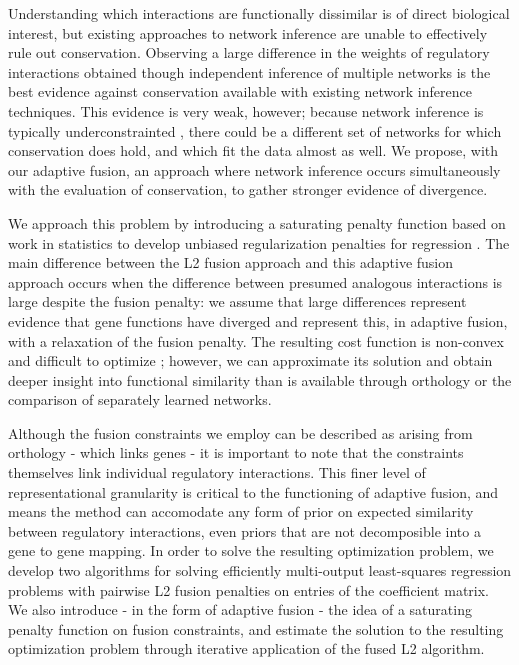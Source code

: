 \documentclass[11pt]{article}
\begin{document}
Understanding which interactions are functionally dissimilar is of direct biological interest, but existing approaches to network inference are unable to effectively rule out conservation. Observing a large difference in the weights of regulatory interactions obtained though independent inference of multiple networks is the best evidence against conservation available with existing network inference techniques. This evidence is very weak, however; because network inference is typically underconstrainted \cite{marbach_revealing_2010-1}, there could be a different set of networks for which conservation does hold, and which fit the data almost as well. We propose, with our adaptive fusion, an approach where network inference occurs simultaneously with the evaluation of conservation, to gather stronger evidence of divergence. 

We approach this problem by introducing a saturating penalty function based on work in statistics to develop unbiased regularization penalties for regression \cite{zhang2010nearly, fan2001variable}. The main difference between the L2 fusion approach and this adaptive fusion approach occurs when the difference between presumed analogous interactions is large despite the fusion penalty: we assume that large differences represent evidence that gene functions have diverged and represent this, in adaptive fusion, with a relaxation of the fusion penalty. The resulting cost function is non-convex and difficult to optimize \cite{fan2001variable}; however, we can approximate its solution and obtain deeper insight into functional similarity than is available through orthology or the comparison of separately learned networks. 

Although the fusion constraints we employ can be described as arising from orthology - which links genes - it is important to note that the constraints themselves link individual regulatory interactions. This finer level of representational granularity is critical to the functioning of adaptive fusion, and means the method can accomodate any form of prior on expected similarity between regulatory interactions, even priors that are not decomposible into a gene to gene mapping. In order to solve the resulting optimization problem, we develop two algorithms for solving efficiently multi-output least-squares regression problems with pairwise L2 fusion penalties on entries of the coefficient matrix. We also introduce - in the form of adaptive fusion - the idea of a saturating penalty function on fusion constraints, and estimate the solution to the resulting optimization problem through iterative application of the fused L2 algorithm.
\end{document}
